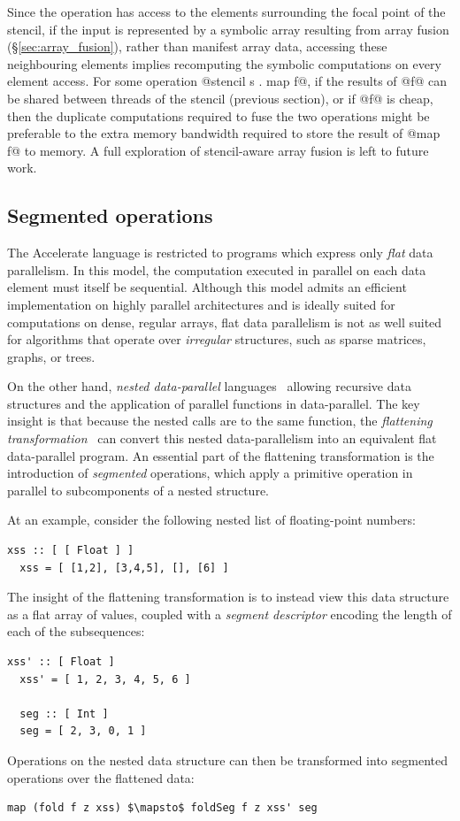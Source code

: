 Since the  operation has access to the elements surrounding the
focal point of the stencil, if the input is represented by a symbolic array
resulting from array fusion\fusion{} (\S\ref{sec:array_fusion}), rather than
manifest array data, accessing these neighbouring elements implies recomputing
the symbolic computations on every element access. For some operation
@stencil s . map f@, if the results of @f@ can be shared between threads of the
stencil (previous section), or if @f@ is cheap, then the duplicate computations
required to fuse the two operations might be preferable to the extra memory
bandwidth required to store the result of @map f@ to memory. A full exploration
of stencil-aware array fusion is left to future work.


\subsection{Segmented operations}
\label{sec:segmented_operations}

The Accelerate language is restricted to programs which express only \emph{flat}
data parallelism. In this model, the computation executed in parallel on each
data element must itself be sequential. Although this model admits an efficient
implementation on highly parallel architectures and is ideally suited for
computations on dense, regular arrays, flat data parallelism is not as well
suited for algorithms that operate over \emph{irregular} structures, such as
sparse matrices, graphs, or trees.

On the other hand, \emph{nested data-parallel}
languages~\cite{Blelloch:1995ut,Levin:1994uu} allowing recursive data structures
and the application of parallel functions in data-parallel. The key insight is
that because the nested calls are to the same function, the \emph{flattening
transformation}~\cite{Blelloch:1988iu} can convert this nested data-parallelism
into an equivalent flat data-parallel program. An essential part of the
flattening transformation is the introduction of \emph{segmented} operations,
which apply a primitive operation in parallel to subcomponents of a nested
structure.

At an example, consider the following nested list of floating-point numbers:
%
\begin{lstlisting}[style=haskell]
  xss :: [ [ Float ] ]
  xss = [ [1,2], [3,4,5], [], [6] ]
\end{lstlisting}
%
The insight of the flattening transformation is to instead view this data
structure as a flat array of values, coupled with a \emph{segment descriptor}
encoding the length of each of the subsequences:
%
\begin{lstlisting}[style=haskell]
  xss' :: [ Float ]
  xss' = [ 1, 2, 3, 4, 5, 6 ]

  seg :: [ Int ]
  seg = [ 2, 3, 0, 1 ]
\end{lstlisting}
%
Operations on the nested data structure can then be transformed into segmented
operations over the flattened data:
%
\begin{lstlisting}[style=haskell,mathescape]
  map (fold f z xss) $\mapsto$ foldSeg f z xss' seg
\end{lstlisting}


